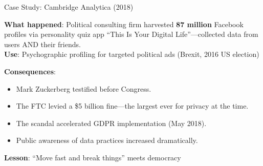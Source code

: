 ﻿\documentclass[aspectratio=169,11pt]{beamer}
\begin{document}
\begin{frame}{Case Study: Cambridge Analytica (2018)}
\begin{casestudybox}
\small
\textbf{What happened}: Political consulting firm harvested \textbf{87 million} Facebook profiles via personality quiz app ``This Is Your Digital Life''---collected data from users AND their friends.\\
\textbf{Use}: Psychographic profiling for targeted political ads (Brexit, 2016 US election)
\end{casestudybox}

\vspace{0.2em}
\textbf{Consequences}:
\begin{itemize}
    \item Mark Zuckerberg testified before Congress.
    \item The FTC levied a \$5 billion fine---the largest ever for privacy at the time.
    \item The scandal accelerated GDPR implementation (May 2018).
    \item Public awareness of data practices increased dramatically.
\end{itemize}

\textbf{Lesson}: ``Move fast and break things'' meets democracy
\end{frame}
\end{document}
